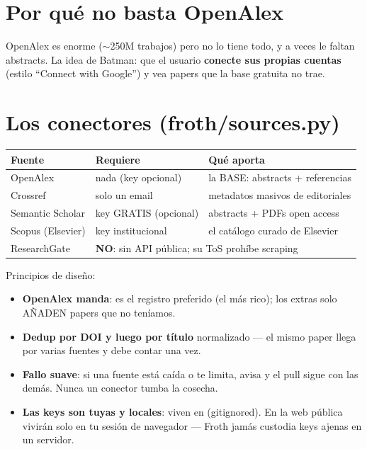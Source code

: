 \documentclass[11pt,a4paper]{article}
\begin{document}

\section{Por qué no basta OpenAlex}

OpenAlex es enorme ($\sim$250M trabajos) pero no lo tiene todo, y a veces le faltan
abstracts. La idea de Batman: que el usuario \textbf{conecte sus propias cuentas} (estilo
``Connect with Google'') y vea papers que la base gratuita no trae.

\section{Los conectores (froth/sources.py)}

\begin{center}
\begin{tabular}{lll}
\textbf{Fuente} & \textbf{Requiere} & \textbf{Qué aporta} \\
\hline
OpenAlex & nada (key opcional) & la BASE: abstracts + referencias \\
Crossref & solo un email & metadatos masivos de editoriales \\
Semantic Scholar & key GRATIS (opcional) & abstracts + PDFs open access \\
Scopus (Elsevier) & key institucional & el catálogo curado de Elsevier \\
ResearchGate & \multicolumn{2}{l}{\textbf{NO}: sin API pública; su ToS prohíbe scraping} \\
\end{tabular}
\end{center}

Principios de diseño:
\begin{itemize}
  \item \textbf{OpenAlex manda}: es el registro preferido (el más rico); los extras solo
        AÑADEN papers que no teníamos.
  \item \textbf{Dedup por DOI y luego por título} normalizado — el mismo paper llega por
        varias fuentes y debe contar una vez.
  \item \textbf{Fallo suave}: si una fuente está caída o te limita, avisa y el pull sigue
        con las demás. Nunca un conector tumba la cosecha.
  \item \textbf{Las keys son tuyas y locales}: viven en  (gitignored).
        En la web pública vivirán solo en tu sesión de navegador — Froth jamás custodia
        keys ajenas en un servidor.
\end{itemize}
\end{document}
